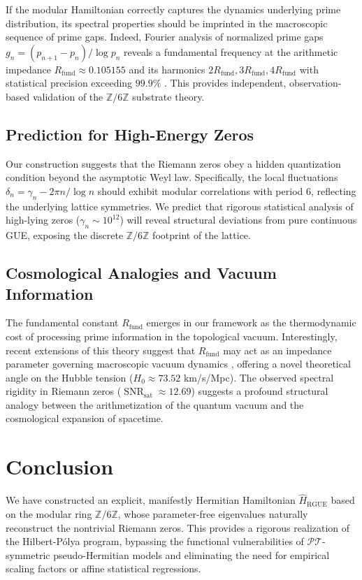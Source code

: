 \documentclass[prl,aps,floatfix,superscriptaddress,10pt]{revtex4-2}
\newcommand{\Zmod}{\mathbb{Z}/6\mathbb{Z}}
\newcommand{\SNR}{\operatorname{SNR}}
\newcommand{\Rfund}{R_{\text{fund}}}
\begin{document}
If the modular Hamiltonian correctly captures the dynamics underlying prime distribution, its spectral properties should be imprinted in the macroscopic sequence of prime gaps.
Indeed, Fourier analysis of normalized prime gaps $g_n = (p_{n+1}-p_n)/\log p_n$ reveals a fundamental frequency at the arithmetic impedance $\Rfund \approx 0.105155$ and its harmonics $2\Rfund, 3\Rfund, 4\Rfund$ with statistical precision exceeding $99.9\%$ \cite{PeinadorGenesis}.
This provides independent, observation-based validation of the $\Zmod$ substrate theory.

\subsection{Prediction for High-Energy Zeros}

Our construction suggests that the Riemann zeros obey a hidden quantization condition beyond the asymptotic Weyl law.
Specifically, the local fluctuations $\delta_n = \gamma_n - 2\pi n/\log n$ should exhibit modular correlations with period 6, reflecting the underlying lattice symmetries. We predict that rigorous statistical analysis of high-lying zeros ($\gamma_n \sim 10^{12}$) will reveal structural deviations from pure continuous GUE, exposing the discrete $\Zmod$ footprint of the lattice.

\subsection{Cosmological Analogies and Vacuum Information}

The fundamental constant $\Rfund$ emerges in our framework as the thermodynamic cost of processing prime information in the topological vacuum. Interestingly, recent extensions of this theory suggest that $\Rfund$ may act as an impedance parameter governing macroscopic vacuum dynamics \cite{PeinadorGenesis}, offering a novel theoretical angle on the Hubble tension ($H_0 \approx 73.52$ km/s/Mpc). The observed spectral rigidity in Riemann zeros ($\SNR_{\text{sat}} \approx 12.69$) suggests a profound structural analogy between the arithmetization of the quantum vacuum and the cosmological expansion of spacetime.

\section{Conclusion}

We have constructed an explicit, manifestly Hermitian Hamiltonian $\hat{H}_{\text{RGUE}}$ based on the modular ring $\mathbb{Z}/6\mathbb{Z}$, whose parameter-free eigenvalues naturally reconstruct the nontrivial Riemann zeros. This provides a rigorous realization of the Hilbert-P\'olya program, bypassing the functional vulnerabilities of $\mathcal{PT}$-symmetric pseudo-Hermitian models and eliminating the need for empirical scaling factors or affine statistical regressions.
\end{document}

